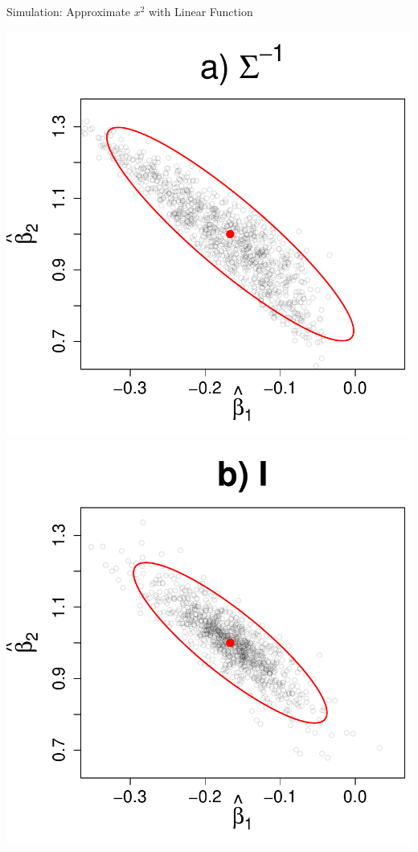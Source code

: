 \documentclass[12pt]{beamer}
\begin{document}
\begin{frame}{Simulation: Approximate $x^2$ with Linear Function}

  
\def \tw {.26}

\includegraphics[scale=\tw]{figs/pres_estimator_wls.pdf}
\includegraphics[scale=\tw]{figs/pres_estimator_ols.pdf}

\end{frame}
\end{document}

